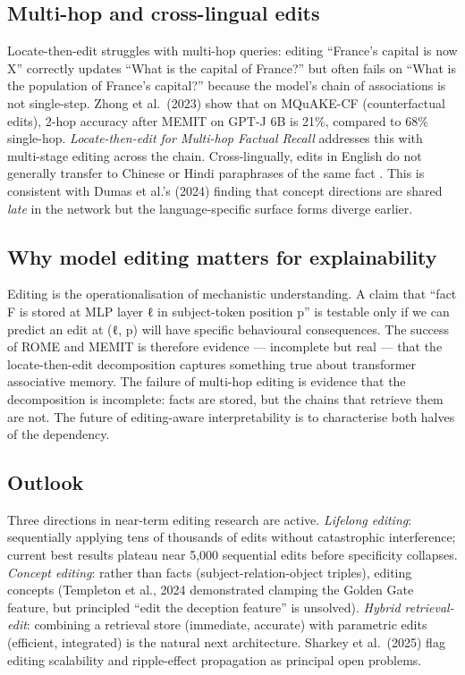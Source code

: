 \documentclass{article}
\begin{document}
\subsection{Multi-hop and cross-lingual edits}\label{multi-hop-and-cross-lingual-edits}

Locate-then-edit struggles with multi-hop queries: editing ``France's capital is now X'' correctly updates ``What is the capital of France?'' but often fails on ``What is the population of France's capital?'' because the model's chain of associations is not single-step. Zhong et al.~(2023) show that on MQuAKE-CF (counterfactual edits), 2-hop accuracy after MEMIT on GPT-J 6B is 21\%, compared to 68\% single-hop. \emph{Locate-then-edit for Multi-hop Factual Recall} \citep{zhang2024acomprehensivestud} addresses this with multi-stage editing across the chain. Cross-lingually, edits in English do not generally transfer to Chinese or Hindi paraphrases of the same fact \citep{wang2023scottselfconsisten}. This is consistent with Dumas et al.'s (2024) finding that concept directions are shared \emph{late} in the network but the language-specific surface forms diverge earlier.

\subsection{Why model editing matters for explainability}\label{why-model-editing-matters-for-explainability}

Editing is the operationalisation of mechanistic understanding. A claim that ``fact F is stored at MLP layer ℓ in subject-token position p'' is testable only if we can predict an edit at (ℓ, p) will have specific behavioural consequences. The success of ROME and MEMIT is therefore evidence --- incomplete but real --- that the locate-then-edit decomposition captures something true about transformer associative memory. The failure of multi-hop editing is evidence that the decomposition is incomplete: facts are stored, but the chains that retrieve them are not. The future of editing-aware interpretability is to characterise both halves of the dependency.

\subsection{Outlook}\label{outlook-1}

Three directions in near-term editing research are active. \emph{Lifelong editing}: sequentially applying tens of thousands of edits without catastrophic interference; current best results plateau near 5,000 sequential edits before specificity collapses. \emph{Concept editing}: rather than facts (subject-relation-object triples), editing concepts (Templeton et al., 2024 demonstrated clamping the Golden Gate feature, but principled ``edit the deception feature'' is unsolved). \emph{Hybrid retrieval-edit}: combining a retrieval store (immediate, accurate) with parametric edits (efficient, integrated) is the natural next architecture. Sharkey et al.~(2025) flag editing scalability and ripple-effect propagation as principal open problems.
\end{document}
